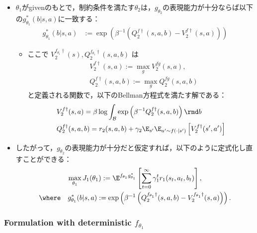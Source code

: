 \documentclass[a4paper,10pt,dvipdfmx]{jsarticle}
\begin{document}
\begin{itemize}
    \item $\theta_1$がgivenのもとで，制約条件を満たす$\theta_2$は，$g_{\theta_2}$の表現能力が十分ならば以下の$g_{\theta_1}^*(b|s,a)$に一致する：
    \begin{align}
        g_{\theta_1}^*(b|s,a)&:=\exp\left(\beta^{-1}\left(Q_2^{f\dag}(s,a,b)-V_2^{f\dag}(s,a)\right)\right)\label{eq:quantal_response_bbf}
    \end{align}
    \begin{itemize}
        \item ここで $V_2^{f_{\theta_1}\dag}(s), Q_2^{f_{\theta_1}\dag}(s,a,b)$ は
        \begin{align}
            &V_2^{f\dag}(s,a):=\max_{g}V_2^{fg}(s,a),\\
            &Q_2^{f\dag}(s,a,b):=\max_{g}Q_2^{fg}(s,a,b)
        \end{align}
        と定義される関数で，以下のBellman方程式を満たす解である：
        \begin{align}
            &V_2^{f\dag}(s,a)=\beta\log\int_{\mathcal{B}}\exp\left(\beta^{-1}Q_2^{f\dag}(s,a,b)\right)\rmd b\\
            &Q_2^{f\dag}(s,a,b)=r_2(s,a,b)+\gamma_2\E_{s'}\E_{a'\sim f(\cdot|s')}\left[V_2^{f\dag}(s',a')\right]
        \end{align}
    \end{itemize}
    \item したがって，$g_{\theta_2}$の表現能力が十分だと仮定すれば，以下のように定式化し直すことができる：
    \begin{gather}
        \max_{\theta_1} J_1(\theta_1):=\E^{f_{\theta_1}g_{\theta_1}^*}\left[\sum_{t=0}^\infty \gamma_1^tr_1(s_t,a_t,b_t)\right],\\
        \where\quad g_{\theta_1}^*(b|s,a):=\exp\left(\beta^{-1}\left(Q_2^{f_{\theta_1}\dag}(s,a,b)-V_2^{f_{\theta_1}\dag}(s,a)\right)\right).
    \end{gather}
\end{itemize}

\subsubsection{Formulation with deterministic $f_{\theta_1}$}
\end{document}
